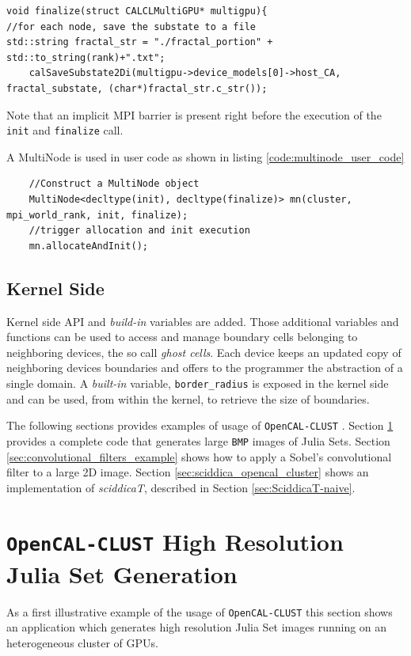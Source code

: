 \begin{lstlisting}
void finalize(struct CALCLMultiGPU* multigpu){
//for each node, save the substate to a file
std::string fractal_str = "./fractal_portion" + std::to_string(rank)+".txt";
    calSaveSubstate2Di(multigpu->device_models[0]->host_CA, fractal_substate, (char*)fractal_str.c_str());
\end{lstlisting}
Note that an implicit MPI barrier is present right before the execution of the \texttt{init} and \texttt{finalize} call.

A MultiNode is used in user code as shown in listing \ref{code:multinode_user_code}

\begin{lstlisting}
    //Construct a MultiNode object
    MultiNode<decltype(init), decltype(finalize)> mn(cluster, mpi_world_rank, init, finalize);
    //trigger allocation and init execution
    mn.allocateAndInit();
\end{lstlisting}

\subsection{Kernel Side }
Kernel side  API  and \textit{build-in} variables are added. Those additional variables and functions can be used to access and manage boundary cells belonging to neighboring devices, the so call \textit{ghost cells}. Each device keeps an updated copy of neighboring devices boundaries and offers to the programmer the abstraction of a single domain. A \textit{built-in} variable, \texttt{border\_radius} is exposed in the kernel side and can be used, from within the kernel, to retrieve the size of boundaries.


The following sections provides examples of usage of \texttt{OpenCAL-CLUST} . Section \ref{sec:opencal_julia} provides a complete code that generates large \texttt{BMP} images of Julia Sets.
Section \ref{sec:convolutional_filters_example} shows how to apply a Sobel's convolutional filter to a large 2D image.
Section \ref{sec:sciddica_opencal_cluster} shows an implementation of \textit{sciddicaT}, described in Section \ref{sec:SciddicaT-naive}. 
\section{\texttt{OpenCAL-CLUST}  High Resolution Julia Set Generation}
\label{sec:opencal_julia}
As a first illustrative example of the usage of \texttt{OpenCAL-CLUST}  this section shows an application which generates high resolution Julia Set images running on an heterogeneous cluster of GPUs.

